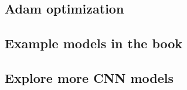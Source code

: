 \subsection{Adam optimization}

\subsection{Example models in the book}

\subsection{Explore more CNN models}